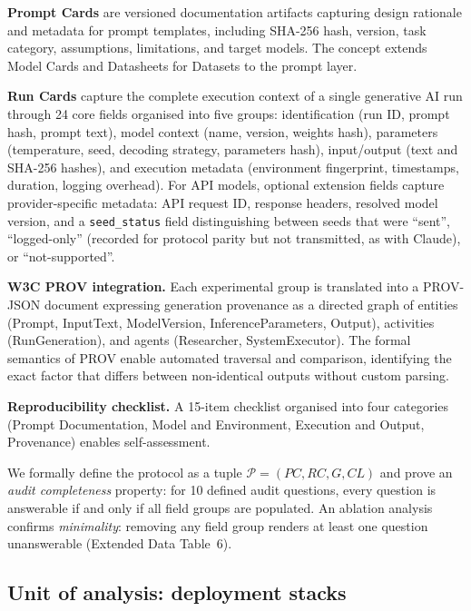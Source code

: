 \documentclass[sn-nature]{sn-jnl}
\begin{document}
\textbf{Prompt Cards} are versioned documentation artifacts capturing design rationale and metadata for prompt templates, including SHA-256 hash, version, task category, assumptions, limitations, and target models.
The concept extends Model Cards\cite{mitchell2019model} and Datasheets for Datasets\cite{gebru2021datasheets} to the prompt layer.

\textbf{Run Cards} capture the complete execution context of a single generative AI run through 24 core fields organised into five groups: identification (run ID, prompt hash, prompt text), model context (name, version, weights hash), parameters (temperature, seed, decoding strategy, parameters hash), input/output (text and SHA-256 hashes), and execution metadata (environment fingerprint, timestamps, duration, logging overhead).
For API models, optional extension fields capture provider-specific metadata: API request ID, response headers, resolved model version, and a \texttt{seed\_status} field distinguishing between seeds that were ``sent'', ``logged-only'' (recorded for protocol parity but not transmitted, as with Claude), or ``not-supported''.

\textbf{W3C PROV integration.}
Each experimental group is translated into a PROV-JSON document\cite{w3cprov2013} expressing generation provenance as a directed graph of entities (Prompt, InputText, ModelVersion, InferenceParameters, Output), activities (RunGeneration), and agents (Researcher, SystemExecutor).
The formal semantics of PROV enable automated traversal and comparison, identifying the exact factor that differs between non-identical outputs without custom parsing.

\textbf{Reproducibility checklist.}
A 15-item checklist organised into four categories (Prompt Documentation, Model and Environment, Execution and Output, Provenance) enables self-assessment.

We formally define the protocol as a tuple $\mathcal{P} = (\mathit{PC}, \mathit{RC}, G, \mathit{CL})$ and prove an \emph{audit completeness} property: for 10 defined audit questions, every question is answerable if and only if all field groups are populated.
An ablation analysis confirms \emph{minimality}: removing any field group renders at least one question unanswerable (Extended Data Table~6).


\subsection{Unit of analysis: deployment stacks}\label{subsec:stacks}
\end{document}
